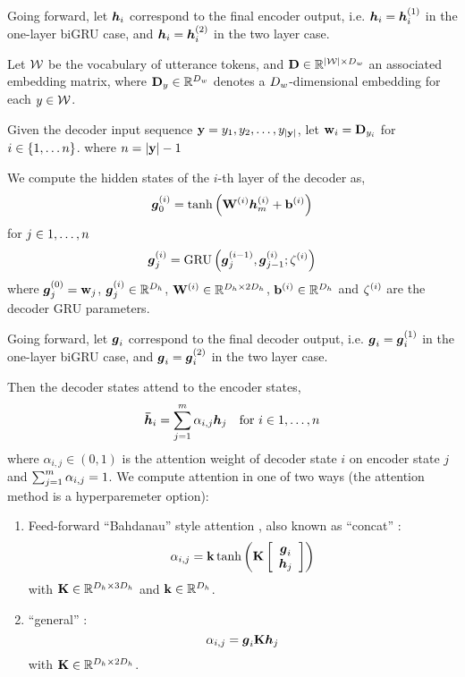 Going forward, let $\boldsymbol{h}_i$ correspond to the final encoder output, 
i.e. $\boldsymbol{h}_i = \boldsymbol{h}_i^{(1)}$
in the one-layer biGRU case, and $\boldsymbol{h}_i=\boldsymbol{h}_i^{(2)}$ in the two layer 
case.


Let $\mathcal{W}$ be the vocabulary of utterance tokens, and 
$\mathbf{D} \in \mathbb{R}^{{\lvert \mathcal{W} \rvert} \times {D_w}}$
an associated embedding matrix, where
$\mathbf{D}_{y} \in \mathbb{R}^{{D_w}}$ denotes a  ${D_w}$-dimensional embedding for
each $y \in \mathcal{W}$.

Given the decoder input sequence $\mathbf{y} = y_1, y_2, \ldots, 
y_{{\lvert \mathbf{y} \rvert}}$, 
let $\mathbf{w}_i = \mathbf{D}_{y_i}$ for $i \in \{1, \ldots n\}$.
where $n = {\lvert \mathbf{y} \rvert} - 1$



We compute the hidden states of the $i$-th layer of the decoder as,
\begin{align*}
\boldsymbol{g}^{(i)}_0 & = \tanh\left(\mathbf{W}^{(i)} \boldsymbol{h}^{(i)}_m + \mathbf{b}^{(i)}\right)\\
\end{align*}
\noindent for $j \in 1,\ldots,n$
\begin{align*}
    \boldsymbol{g}^{(i)}_j &= \operatorname{GRU}\left(\boldsymbol{g}^{(i-1)}_j, \boldsymbol{g}^{(i)}_{j-1};
            {\zeta}^{(i)}\right) \\
\end{align*}
where $\boldsymbol{g}^{(0)}_j = \mathbf{w}_j$, $\boldsymbol{g}^{(i)}_j \in \mathbb{R}^{{D_h}}$, $\mathbf{W}^{(i)} \in \mathbb{R}^{{D_h} \times 2{D_h}}$, $\mathbf{b}^{(i)} \in \mathbb{R}^{{D_h}}$ and ${\zeta}^{(i)}$ are the decoder GRU parameters.

Going forward, let $\boldsymbol{g}_i$ correspond to the final decoder output, 
i.e. $\boldsymbol{g}_i = \boldsymbol{g}_i^{(1)}$
in the one-layer biGRU case, and $\boldsymbol{g}_i=\boldsymbol{g}_i^{(2)}$ in the two layer 
case.



Then the decoder states attend to the encoder states,
\begin{align*}
    \boldsymbol{\bar{h}}_i & = \sum^{m}_{j=1}\alpha_{i,j}\boldsymbol{h}_j & \textrm{for $i \in 1,\ldots, n$}
\end{align*}
where $\alpha_{i,j} \in (0, 1)$ is the 
attention weight of decoder state $i$ on encoder state $j$ and 
$\sum^{m}_{j=1}\alpha_{i,j} = 1$.
We compute 
attention in one of two ways (the attention method is a hyperparemeter
option):
\begin{enumerate}
\item Feed-forward ``Bahdanau'' style attention \cite{bahdanau2015},
    also known as ``concat'' \cite{luong2015}: 
\[ \alpha_{i,j} = \mathbf{k} \tanh\left(\mathbf{K}\left[\begin{array}{c} 
    \boldsymbol{g}_i \\ \boldsymbol{h}_j\end{array}\right] \right)  \] with 
$\mathbf{K} \in \mathbb{R}^{{D_h} \times 3{D_h}}$ and 
$\mathbf{k} \in \mathbb{R}^{{D_h}}$.
\item ``general'' \cite{luong2015} :
    \[ \alpha_{i,j} = \boldsymbol{g}_i \mathbf{K}  \boldsymbol{h}_j  \] with $\mathbf{K} \in \mathbb{R}^{{D_h} \times 2{D_h}}$.
\end{enumerate}

